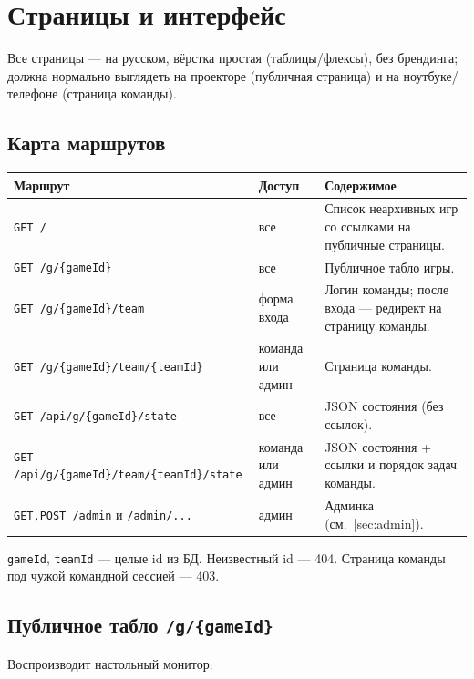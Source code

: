 \documentclass[12pt,a4paper]{article}
\newcommand{\field}[1]{\texttt{#1}}
\begin{document}
\section{Страницы и интерфейс}
\label{sec:pages}

Все страницы --- на русском, вёрстка простая (таблицы/флексы), без
брендинга; должна нормально выглядеть на проекторе (публичная страница) и на
ноутбуке/телефоне (страница команды).

\subsection{Карта маршрутов}

\begin{longtable}{@{}p{6.4cm}p{2.2cm}p{6.6cm}@{}}
\toprule
\textbf{Маршрут} & \textbf{Доступ} & \textbf{Содержимое} \\
\midrule
\field{GET /} & все & Список неархивных игр со ссылками на публичные страницы. \\
\field{GET /g/\{gameId\}} & все & Публичное табло игры. \\
\field{GET /g/\{gameId\}/team} & форма входа & Логин команды; после входа --- редирект на страницу команды. \\
\field{GET /g/\{gameId\}/team/\{teamId\}} & команда или админ & Страница команды. \\
\field{GET /api/g/\{gameId\}/state} & все & JSON состояния (без ссылок). \\
\field{GET /api/g/\{gameId\}/team/\{teamId\}/state} & команда или админ & JSON состояния + ссылки и порядок задач команды. \\
\field{GET,POST /admin} и \field{/admin/...} & админ & Админка (см.~\ref{sec:admin}). \\
\bottomrule
\end{longtable}

\field{gameId}, \field{teamId} --- целые id из БД. Неизвестный id --- 404.
Страница команды под чужой командной сессией --- 403.

\subsection{Публичное табло \field{/g/\{gameId\}}}

Воспроизводит настольный монитор:
\end{document}
